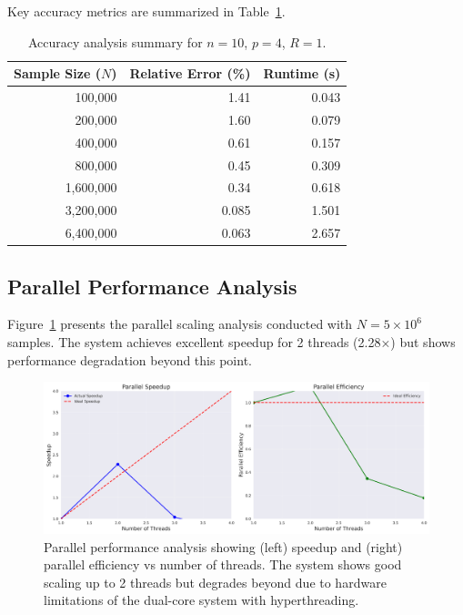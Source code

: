 \documentclass[11pt,a4paper]{article}
\begin{document}
	Key accuracy metrics are summarized in Table~\ref{table:accuracy_summary}.
	
	\begin{table}[H]
		\centering
		\caption{Accuracy analysis summary for $n=10$, $p=4$, $R=1$.}
		\label{table:accuracy_summary}
		\begin{tabular}{rrr}
			\toprule
			Sample Size ($N$) & Relative Error (\%) & Runtime (s) \\
			\midrule
			100,000 & 1.41 & 0.043 \\
			200,000 & 1.60 & 0.079 \\
			400,000 & 0.61 & 0.157 \\
			800,000 & 0.45 & 0.309 \\
			1,600,000 & 0.34 & 0.618 \\
			3,200,000 & 0.085 & 1.501 \\
			6,400,000 & 0.063 & 2.657 \\
			\bottomrule
		\end{tabular}
	\end{table}
	
	\subsection{Parallel Performance Analysis}
	
	Figure~\ref{fig:scaling} presents the parallel scaling analysis conducted with $N = 5 \times 10^6$ samples. The system achieves excellent speedup for 2 threads (2.28×) but shows performance degradation beyond this point.
	
	\begin{figure}[H]
		\centering
		\includegraphics[width=\linewidth]{../plots/scaling_analysis.png}
		\caption{Parallel performance analysis showing (left) speedup and (right) parallel efficiency vs number of threads. The system shows good scaling up to 2 threads but degrades beyond due to hardware limitations of the dual-core system with hyperthreading.}
		\label{fig:scaling}
	\end{figure}
	
\end{document}
